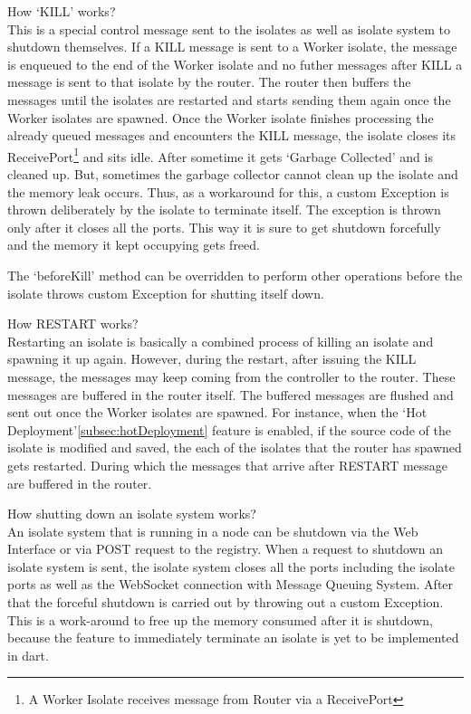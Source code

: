 \begin{description}
    \item How ‘KILL’ works?\\
    This is a special control message sent to the isolates as well as isolate system to shutdown themselves. If a KILL message is sent to a Worker isolate, the message is enqueued to the end of the Worker isolate and no futher messages after KILL a message is sent to that isolate by the router. The router then buffers the messages until the isolates are restarted and starts sending them again once the Worker isolates are spawned. Once the Worker isolate finishes processing the already queued messages and encounters the KILL message, the isolate closes its ReceivePort\footnote{A Worker Isolate receives message from Router via a ReceivePort} and sits idle. After sometime it gets ‘Garbage Collected’ and is cleaned up. But, sometimes the garbage collector cannot clean up the isolate and the memory leak occurs. Thus, as a workaround for this, a custom Exception is thrown deliberately by the isolate to terminate itself. The exception is thrown only after it closes all the ports. This way it is sure to get shutdown forcefully and the memory it kept occupying gets freed.

    The ‘beforeKill’ method can be overridden to perform other operations before the isolate throws custom Exception for shutting itself down.

    \item How RESTART works?\\
    Restarting an isolate is basically a combined process of killing an isolate and spawning it up again. However, during the restart, after issuing the KILL message, the messages may keep coming from the controller to the router. These messages are buffered in the router itself. The buffered messages are flushed and sent out once the Worker isolates are spawned. For instance, when the ‘Hot Deployment’\autoref{subsec:hotDeployment} feature is enabled, if the source code of the isolate is modified and saved, the each of the isolates that the router has spawned gets restarted. During which the messages that arrive after RESTART message are buffered in the router.

    \item How shutting down an isolate system works?\\
    An isolate system that is running in a node can be shutdown via the Web Interface or via POST request to the registry. When a request to shutdown an isolate system is sent, the isolate system closes all the ports including the isolate ports as well as the WebSocket connection with Message Queuing System. After that the forceful shutdown is carried out by throwing out a custom Exception. This is a work-around to free up the memory consumed after it is shutdown, because the feature to immediately terminate an isolate is yet to be implemented in dart.
  \end{description}

